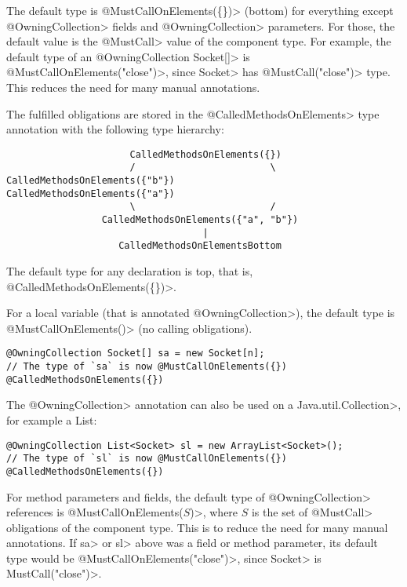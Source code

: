 The default type is \<@MustCallOnElements(\{\})> (bottom) for everything except
\<@OwningCollection> fields and \<@OwningCollection> parameters. For those, the
default \MustCallOnElements value is the \<@MustCall> value of the component
type. For example, the default type of an \<@OwningCollection Socket[]> is
\<@MustCallOnElements({"close"})>, since \<Socket> has \<@MustCall("close")>
type. This reduces the need for many manual annotations.

The fulfilled obligations are stored in the \<@CalledMethodsOnElements> type annotation with the following type hierarchy:
\begin{verbatim}
                      CalledMethodsOnElements({})
                      /                        \
CalledMethodsOnElements({"b"})           CalledMethodsOnElements({"a"})
                      \                        /
                 CalledMethodsOnElements({"a", "b"})
                                   |
                    CalledMethodsOnElementsBottom
\end{verbatim}
The default type for any declaration is top, that is, \<@CalledMethodsOnElements(\{\})>.



For a local variable (that is annotated \<@OwningCollection>), the default
type is \<@MustCallOnElements({})> (no calling obligations).

\begin{Verbatim}
@OwningCollection Socket[] sa = new Socket[n];
// The type of `sa` is now @MustCallOnElements({}) @CalledMethodsOnElements({})
\end{Verbatim}


The \<@OwningCollection> annotation can also be used on a \<Java.util.Collection>, for example a List:
\begin{Verbatim}
@OwningCollection List<Socket> sl = new ArrayList<Socket>();
// The type of `sl` is now @MustCallOnElements({}) @CalledMethodsOnElements({})
\end{Verbatim}

For method parameters and fields, the default type of \<@OwningCollection>
references is \<@MustCallOnElements($S$)>, where $S$ is the set of
\<@MustCall> obligations of the component type. This is to reduce the need
for many manual annotations. If \<sa> or \<sl> above was a field or method
parameter, its default type would be \<@MustCallOnElements({"close"})>,
since \<Socket> is \<MustCall("close")>.


